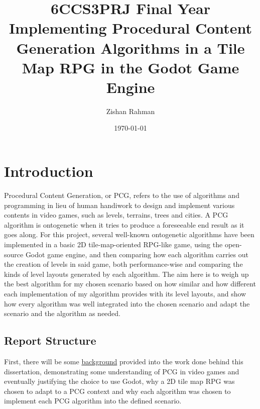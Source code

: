 \documentclass[11pt]{informatics-report}
\title{6CCS3PRJ Final Year\\\vspace{0.2cm}Implementing Procedural Content Generation Algorithms in a Tile Map RPG in the Godot Game Engine}
\author{Zishan Rahman}
\date{\today}
\begin{document}
\createFrontMatter
\onehalfspacing
\tableofcontents{}
\doublespacing


\chapter{Introduction}

Procedural Content Generation, or PCG, refers to the use of algorithms and programming in lieu of human handiwork to design and implement various contents in video games, such as levels, terrains, trees and cities. A PCG algorithm is ontogenetic when it tries to produce a foreseeable end result as it goes along. For this project, several well-known ontogenetic algorithms have been implemented in a basic 2D tile-map-oriented RPG-like game, using the open-source Godot game engine, and then comparing how each algorithm carries out the creation of levels in said game, both performance-wise and comparing the kinds of level layouts generated by each algorithm. The aim here is to weigh up the best algorithm for my chosen scenario based on how similar and how different each implementation of my algorithm provides with its level layouts, and show how every algorithm was well integrated into the chosen scenario and adapt the scenario and the algorithm as needed.

\section{Report Structure}

First, there will be some \hyperref[Background]{background} provided into the work done behind this dissertation, demonstrating some understanding of PCG in video games and eventually justifying the choice to use Godot, why a 2D tile map RPG was chosen to adapt to a PCG context and why each algorithm was chosen to implement each PCG algorithm into the defined scenario.
\end{document}
